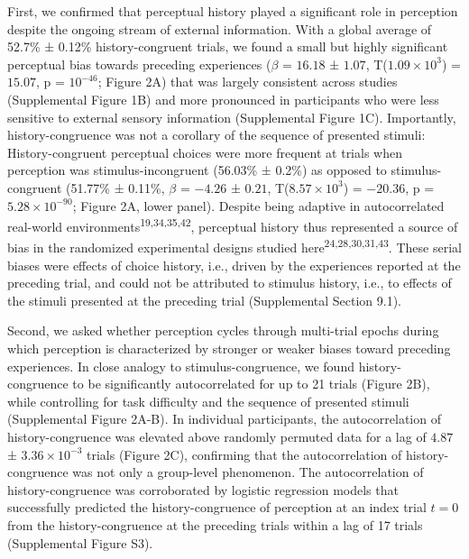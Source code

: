 \documentclass[
]{article}
\begin{document}
First, we confirmed that perceptual history played a significant role in
perception despite the ongoing stream of external information. With a
global average of 52.7\% ± 0.12\% history-congruent trials, we found a
small but highly significant perceptual bias towards preceding
experiences (\(\beta\) = \(16.18\) ± \(1.07\),
T(\(\ensuremath{1.09\times 10^{3}}\)) = \(15.07\), p =
\(\ensuremath{10^{-46}}\); Figure 2A) that was largely consistent across
studies (Supplemental Figure 1B) and more pronounced in participants who
were less sensitive to external sensory information (Supplemental Figure
1C). Importantly, history-congruence was not a corollary of the sequence
of presented stimuli: History-congruent perceptual choices were more
frequent at trials when perception was stimulus-incongruent (56.03\% ±
0.2\%) as opposed to stimulus-congruent (51.77\% ± 0.11\%, \(\beta\) =
\(-4.26\) ± \(0.21\), T(\(\ensuremath{8.57\times 10^{3}}\)) =
\(-20.36\), p = \(\ensuremath{5.28\times 10^{-90}}\); Figure 2A, lower
panel). Despite being adaptive in autocorrelated real-world
environments\textsuperscript{19,34,35,42}, perceptual history thus
represented a source of bias in the randomized experimental designs
studied here\textsuperscript{24,28,30,31,43}. These serial biases were
effects of choice history, i.e., driven by the experiences reported at
the preceding trial, and could not be attributed to stimulus history,
i.e., to effects of the stimuli presented at the preceding trial
(Supplemental Section 9.1).

Second, we asked whether perception cycles through multi-trial epochs
during which perception is characterized by stronger or weaker biases
toward preceding experiences. In close analogy to stimulus-congruence,
we found history-congruence to be significantly autocorrelated for up to
21 trials (Figure 2B), while controlling for task difficulty and the
sequence of presented stimuli (Supplemental Figure 2A-B). In individual
participants, the autocorrelation of history-congruence was elevated
above randomly permuted data for a lag of \(4.87\) ±
\(\ensuremath{3.36\times 10^{-3}}\) trials (Figure 2C), confirming that
the autocorrelation of history-congruence was not only a group-level
phenomenon. The autocorrelation of history-congruence was corroborated
by logistic regression models that successfully predicted the
history-congruence of perception at an index trial \(t = 0\) from the
history-congruence at the preceding trials within a lag of 17 trials
(Supplemental Figure S3).
\end{document}
